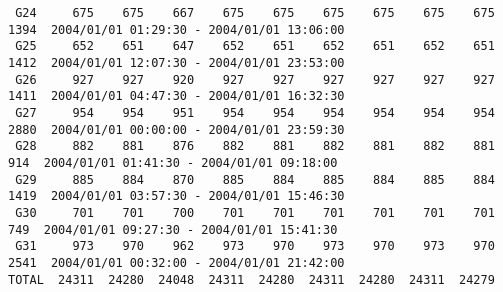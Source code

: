 \begin{\outputsize}
\begin{lstlisting}
 G24     675    675    667    675    675    675    675    675    675   1394  2004/01/01 01:29:30 - 2004/01/01 13:06:00
 G25     652    651    647    652    651    652    651    652    651   1412  2004/01/01 12:07:30 - 2004/01/01 23:53:00
 G26     927    927    920    927    927    927    927    927    927   1411  2004/01/01 04:47:30 - 2004/01/01 16:32:30
 G27     954    954    951    954    954    954    954    954    954   2880  2004/01/01 00:00:00 - 2004/01/01 23:59:30
 G28     882    881    876    882    881    882    881    882    881    914  2004/01/01 01:41:30 - 2004/01/01 09:18:00
 G29     885    884    870    885    884    885    884    885    884   1419  2004/01/01 03:57:30 - 2004/01/01 15:46:30
 G30     701    701    700    701    701    701    701    701    701    749  2004/01/01 09:27:30 - 2004/01/01 15:41:30
 G31     973    970    962    973    970    973    970    973    970   2541  2004/01/01 00:32:00 - 2004/01/01 21:42:00
TOTAL  24311  24280  24048  24311  24280  24311  24280  24311  24279


\end{lstlisting}
\end{\outputsize}

%
